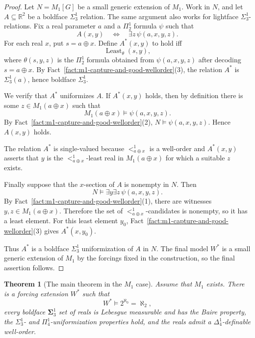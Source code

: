 \documentclass[a4paper,11pt]{article}
\newtheorem{theorem}{Theorem}[section]
\begin{document}
\begin{proof}
Let \(N=M_1[G]\) be a small generic extension of \(M_1\).  Work in \(N\), and
let \(A\subseteq\mathbb R^2\) be a boldface \(\Sigma^1_3\) relation.  The same
argument also works for lightface \(\Sigma^1_3\)-relations.  Fix a real
parameter \(a\) and a \(\Pi^1_2\) formula \(\psi\) such that
\[
   A(x,y)\quad\Longleftrightarrow\quad \exists z\,\psi(a,x,y,z).
\]
For each real \(x\), put \(s=a\oplus x\).  Define \(A^*(x,y)\) to hold iff
\[
   \operatorname{Least}_{\theta}(s,y),
\]
where \(\theta(s,y,z)\) is the \(\Pi^1_2\) formula obtained from
\(\psi(a,x,y,z)\) after decoding \(s=a\oplus x\).  By
Fact~\ref{fact:m1-capture-and-good-wellorder}(3), the relation \(A^*\) is
\(\Sigma^1_3(a)\), hence boldface \(\Sigma^1_3\).

We verify that \(A^*\) uniformizes \(A\).  If \(A^*(x,y)\) holds, then by
definition there is some \(z\in M_1(a\oplus x)\) such that
\[
   M_1(a\oplus x)\models \psi(a,x,y,z).
\]
By Fact~\ref{fact:m1-capture-and-good-wellorder}(2),
\(N\models\psi(a,x,y,z)\).  Hence \(A(x,y)\) holds.

The relation \(A^*\) is single-valued because \(<^1_{a\oplus x}\) is a
well-order and \(A^*(x,y)\) asserts that \(y\) is the
\(<^1_{a\oplus x}\)-least real in \(M_1(a\oplus x)\) for which a suitable
\(z\) exists.

Finally suppose that the \(x\)-section of \(A\) is nonempty in \(N\).  Then
\[
   N\models \exists y\exists z\,\psi(a,x,y,z).
\]
By Fact~\ref{fact:m1-capture-and-good-wellorder}(1), there are witnesses
\(y,z\in M_1(a\oplus x)\).  Therefore the set of \(<^1_{a\oplus x}\)-candidates
is nonempty, so it has a least element.  For this least element \(y_0\),
Fact~\ref{fact:m1-capture-and-good-wellorder}(3) gives \(A^*(x,y_0)\).

Thus \(A^*\) is a boldface \(\Sigma^1_3\) uniformization of \(A\) in \(N\).  The
final model \(W^\ast\) is a small generic extension of \(M_1\) by the forcings
fixed in the construction, so the final assertion follows.
\end{proof}


\begin{theorem}[The main theorem in the $M_1$ case]\label{thm:main-m1-final}
Assume that $M_1$ exists.  There is a forcing extension $W^\ast$ such that
\[
   W^\ast\models 2^{\aleph_0}=\aleph_2,
\]
every boldface $\boldsymbol\Sigma^1_3$ set of reals is Lebesgue measurable and has the Baire property, the $\Sigma^1_3$- and $\Pi^1_4$-uniformization properties hold, and the reals admit a $\Delta^1_4$-definable well-order.
\end{theorem}
\end{document}
